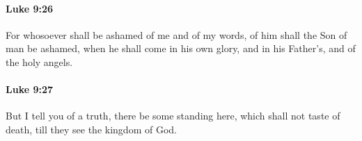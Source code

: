 		\paragraph{Luke 9:26} %
			\label{LUKE-9-26}

			For whosoever shall be ashamed of me and of my words, of him shall the Son of man be ashamed, when he shall come in his own glory, and in his Father's, and of the holy angels.

			\begin{framed}
			\scriptsize
				\begin{compactdesc}
					\item[SBLG] 
				\end{compactdesc}
			\end{framed}

		\paragraph{Luke 9:27} %
			\label{LUKE-9-27}

			But I tell you of a truth, there be some standing here, which shall not taste of death, till they see the kingdom of God.

